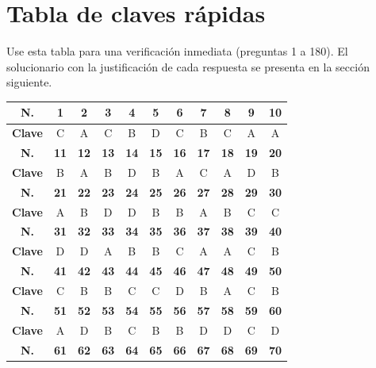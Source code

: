 \newpage
\section*{Tabla de claves rápidas}

\noindent Use esta tabla para una verificación inmediata (preguntas 1 a 180). El solucionario con la justificación de cada respuesta se presenta en la sección siguiente.

\vspace{0.35cm}
\begin{center}
\footnotesize
\renewcommand{\arraystretch}{1.25}
\begin{tabular}{|c|c|c|c|c|c|c|c|c|c|c|}
\hline
\textbf{N.} & \textbf{1} & \textbf{2} & \textbf{3} & \textbf{4} & \textbf{5} & \textbf{6} & \textbf{7} & \textbf{8} & \textbf{9} & \textbf{10} \\
\hline
\textbf{Clave} & C & A & C & B & D & C & B & C & A & A \\
\hline
\textbf{N.} & \textbf{11} & \textbf{12} & \textbf{13} & \textbf{14} & \textbf{15} & \textbf{16} & \textbf{17} & \textbf{18} & \textbf{19} & \textbf{20} \\
\hline
\textbf{Clave} & B & A & B & D & B & A & C & A & D & B \\
\hline
\textbf{N.} & \textbf{21} & \textbf{22} & \textbf{23} & \textbf{24} & \textbf{25} & \textbf{26} & \textbf{27} & \textbf{28} & \textbf{29} & \textbf{30} \\
\hline
\textbf{Clave} & A & B & D & D & B & B & A & B & C & C \\
\hline
\textbf{N.} & \textbf{31} & \textbf{32} & \textbf{33} & \textbf{34} & \textbf{35} & \textbf{36} & \textbf{37} & \textbf{38} & \textbf{39} & \textbf{40} \\
\hline
\textbf{Clave} & D & D & A & B & B & C & A & A & C & B \\
\hline
\textbf{N.} & \textbf{41} & \textbf{42} & \textbf{43} & \textbf{44} & \textbf{45} & \textbf{46} & \textbf{47} & \textbf{48} & \textbf{49} & \textbf{50} \\
\hline
\textbf{Clave} & C & B & B & C & C & D & B & A & C & B \\
\hline
\textbf{N.} & \textbf{51} & \textbf{52} & \textbf{53} & \textbf{54} & \textbf{55} & \textbf{56} & \textbf{57} & \textbf{58} & \textbf{59} & \textbf{60} \\
\hline
\textbf{Clave} & A & D & B & C & B & B & D & D & C & D \\
\hline
\textbf{N.} & \textbf{61} & \textbf{62} & \textbf{63} & \textbf{64} & \textbf{65} & \textbf{66} & \textbf{67} & \textbf{68} & \textbf{69} & \textbf{70} \\

\end{tabular}
\end{center}
